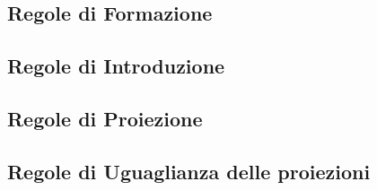 \subsection{Regole di Formazione}
\label{subsec: formazione-prod-cart}
\begin{prooftree}
\end{prooftree}

\subsection{Regole di Introduzione}
\label{subsec: introduzione-prod-cart}
\begin{prooftree}
\end{prooftree}

\subsection{Regole di Proiezione}
\label{subsec: proiezione-prod-cart}
\begin{prooftree}
\end{prooftree}
\begin{prooftree}
\end{prooftree}

\subsection{Regole di Uguaglianza delle proiezioni}
\label{subsec: ugualgianza-proiezioni-prod-cart}
\begin{prooftree}
\end{prooftree}
\begin{prooftree}
\end{prooftree}

